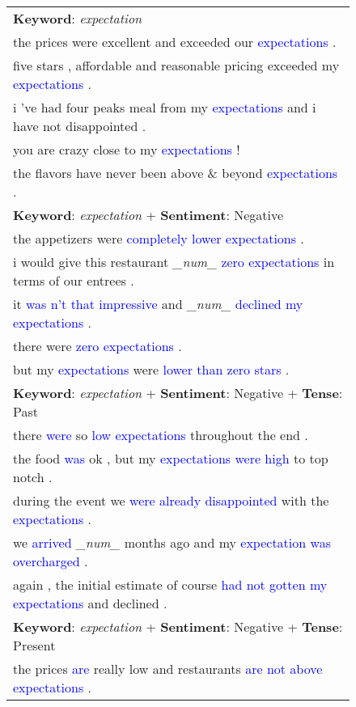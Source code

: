 \documentclass[11pt]{article}
\newcommand{\tenc}[1]{\textcolor{blue}{#1}}
\begin{document}
\begin{figure}[ht]
\vspace{-5pt}
\begin{minipage}[ht]{.51\linewidth}
\centering
\scriptsize
\begin{tabular}{l}
\toprule
\textbf{Keyword}: \textit{expectation}\\
the prices were excellent and exceeded our \tenc{expectations} .
\\
five stars , affordable and reasonable pricing exceeded my \tenc{expectations} .
\\
i 've had four peaks meal from my \tenc{expectations} and i have not disappointed .
\\
you are crazy close to my \tenc{expectations} !
\\
the flavors have never been above \& beyond \tenc{expectations} .\\\midrule
\textbf{Keyword}: \textit{expectation} + \textbf{Sentiment}: Negative\\
the appetizers were \tenc{completely lower expectations} .
\\
i would give this restaurant \textit{\_num\_} \tenc{zero expectations} in terms of our entrees .
\\
it \tenc{was n't that impressive} and \textit{\_num\_} \tenc{declined my expectations} .
\\
there were \tenc{zero expectations} .
\\
but my \tenc{expectations} were \tenc{lower than zero stars} .
\\\midrule
 \textbf{Keyword}: \textit{expectation} + \textbf{Sentiment}: Negative + \textbf{Tense}: Past\\
there \tenc{were} so \tenc{low expectations} throughout the end .
\\
the food \tenc{was} ok , but my \tenc{expectations were high} to top notch .
\\
during the event we \tenc{were already disappointed} with the  \tenc{expectations} .
\\
we  \tenc{arrived} \textit{\_num\_} months ago and my  \tenc{expectation was overcharged} .
\\
again , the initial estimate of course \tenc{had not gotten my expectations} and declined .
\\\midrule
 \textbf{Keyword}: \textit{expectation} + \textbf{Sentiment}: Negative + \textbf{Tense}: Present\\
the prices  \tenc{are} really low and restaurants  \tenc{are not above expectations} .

\end{tabular}
\end{minipage}
\end{figure}
\end{document}
